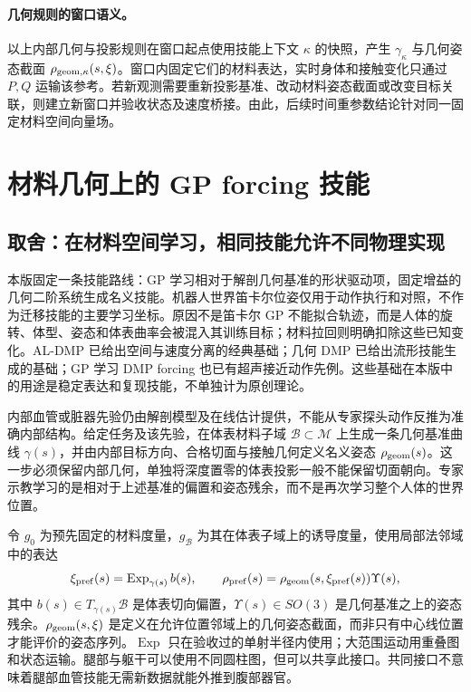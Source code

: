 \documentclass[11pt,a4paper]{article}
\numberwithin{equation}{section}
\theoremstyle{definition}
\begin{document}
\paragraph{几何规则的窗口语义。}
以上内部几何与投影规则在窗口起点使用技能上下文 $\kappa$ 的快照，产生 $\gamma_\kappa$ 与几何姿态截面 $\rho_{{\rm geom},\kappa}(s,\xi)$。窗口内固定它们的材料表达，实时身体和接触变化只通过 $P,Q$ 运输该参考。若新观测需要重新投影基准、改动材料姿态截面或改变目标关联，则建立新窗口并验收状态及速度桥接。由此，后续时间重参数结论针对同一固定材料空间向量场。




\section{材料几何上的 GP forcing 技能}\label{sec:rev:skill}
\label{sec:v43-geometric-skill}

\subsection{取舍：在材料空间学习，相同技能允许不同物理实现}
本版固定一条技能路线：GP 学习相对于解剖几何基准的形状驱动项，固定增益的几何二阶系统生成名义技能。机器人世界笛卡尔位姿仅用于动作执行和对照，不作为迁移技能的主要学习坐标。原因不是笛卡尔 GP 不能拟合轨迹，而是人体的旋转、体型、姿态和体表曲率会被混入其训练目标；材料拉回则明确扣除这些已知变化。AL-DMP 已给出空间与速度分离的经典基础\cite{aldmp2016}；几何 DMP 已给出流形技能生成的基础\cite{gdmp2024}；GP 学习 DMP forcing 也已有超声接近动作先例\cite{gpdmp2026}。这些基础在本版中的用途是稳定表达和复现技能，不单独计为原创理论。

内部血管或脏器先验仍由解剖模型及在线估计提供，不能从专家探头动作反推为准确内部结构。给定任务及该先验，在体表材料子域 $\mathcal B\subset\mathcal M$ 上生成一条几何基准曲线 $\gamma(s)$，并由内部目标方向、合格切面与接触几何定义名义姿态 $\rho_{\rm geom}(s)$。这一步必须保留内部几何，单独将深度置零的体表投影一般不能保留切面朝向。专家示教学习的是相对于上述基准的偏置和姿态残余，而不是再次学习整个人体的世界位置。

令 $g_0$ 为预先固定的材料度量，$g_{\mathcal B}$ 为其在体表子域上的诱导度量，使用局部法邻域中的表达
\begin{equation}
 \xi_{\rm pref}(s)=\operatorname{Exp}_{\gamma(s)} b(s),\qquad
 \rho_{\rm pref}(s)=\rho_{\rm geom}(s,\xi_{\rm pref}(s))\Upsilon(s),
 \label{eq:v43-skill-state}
\end{equation}
其中 $b(s)\in T_{\gamma(s)}\mathcal B$ 是体表切向偏置，$\Upsilon(s)\in SO(3)$ 是几何基准之上的姿态残余。$\rho_{\rm geom}(s,\xi)$ 是定义在允许位置邻域上的几何姿态截面，而非只有中心线位置才能评价的姿态序列。$\operatorname{Exp}$ 只在验收过的单射半径内使用；大范围运动用重叠图和状态运输。腿部与躯干可以使用不同圆柱图，但可以共享此接口。共同接口不意味着腿部血管技能无需新数据就能外推到腹部器官。
\end{document}
